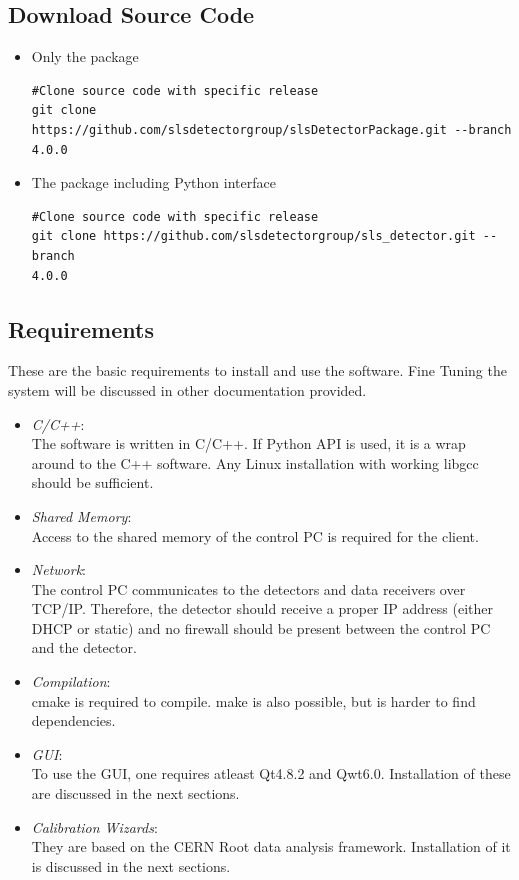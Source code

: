 \documentclass{article}
\begin{document}
\subsection{Download Source Code}

\begin{itemize}
 \item Only the package
\begin{verbatim}
#Clone source code with specific release
git clone https://github.com/slsdetectorgroup/slsDetectorPackage.git --branch
4.0.0
\end{verbatim}
 \item The package including Python interface
\begin{verbatim}
#Clone source code with specific release
git clone https://github.com/slsdetectorgroup/sls_detector.git --branch
4.0.0
\end{verbatim}
\end{itemize}



\subsection{Requirements}
These are the basic requirements to install and use the software. Fine Tuning
the system will be discussed in other documentation provided.
\begin{itemize}

 \item \emph{C/C++}:\\
The software is written in C/C++. If Python API is used, it is a wrap around
to the C++ software.  Any Linux installation with working libgcc should be
sufficient.

 \item \emph{Shared Memory}:\\
Access to the shared memory of the control PC is required for the client.

 \item \emph{Network}:\\
The control PC communicates to the detectors and data receivers over TCP/IP.
Therefore, the detector should receive a proper IP address (either DHCP or
static) and no firewall should be present between the control PC and the
detector.

\item \emph{Compilation}:\\
cmake is required to compile. make is also possible, but is harder to find
dependencies.

\item \emph{GUI}:\\
To use the GUI, one requires atleast Qt4.8.2 and Qwt6.0. Installation of these
are discussed in the next sections.

\item \emph{Calibration Wizards}:\\
They are based on the CERN Root data analysis framework. Installation of it is
discussed in the next sections.

\end{itemize}
\end{document}
